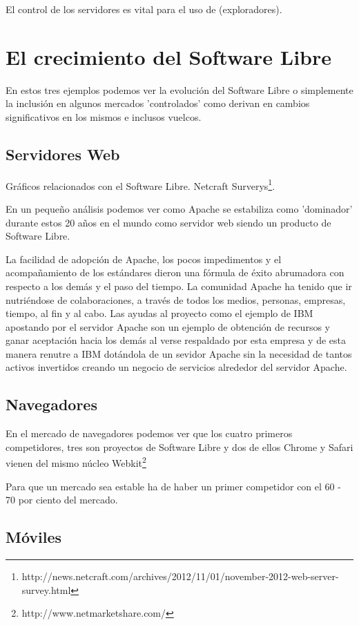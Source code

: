 \documentclass[11pt]{scrartcl}
\begin{document}
El control de los servidores es vital para el uso de (exploradores).

\section{El crecimiento del Software Libre}

En estos tres ejemplos podemos ver la evolución del Software Libre o simplemente la inclusión en algunos mercados 'controlados' como derivan en cambios significativos en los mismos e inclusos vuelcos.

\subsection{Servidores Web}

Gráficos relacionados con el Software Libre. Netcraft Surverys\footnote{http://news.netcraft.com/archives/2012/11/01/november-2012-web-server-survey.html}.

En un pequeño análisis podemos ver como Apache se estabiliza como 'dominador' durante estos 20 años en el mundo como servidor web siendo un producto de Software Libre.

La facilidad de adopción de Apache, los pocos impedimentos y el acompañamiento de los estándares dieron una fórmula de éxito abrumadora con respecto a los demás y el paso del tiempo.
La comunidad Apache ha tenido que ir nutriéndose de colaboraciones, a través de todos los medios, personas, empresas, tiempo, al fin y al cabo.
Las ayudas al proyecto como el ejemplo de IBM apostando por el servidor Apache son un ejemplo de obtención de recursos y ganar aceptación hacia los demás al verse respaldado por esta empresa y de esta manera renutre a IBM dotándola de un sevidor Apache sin la necesidad de tantos activos invertidos creando un negocio de servicios alrededor del servidor Apache.

\subsection{Navegadores}

En el mercado de navegadores podemos ver que los cuatro primeros competidores, tres son proyectos de Software Libre y dos de ellos Chrome y Safari vienen del mismo núcleo Webkit\footnote{http://www.netmarketshare.com/}

Para que un mercado sea estable ha de haber un primer competidor con el 60 - 70 por ciento del mercado.

\subsection{Móviles}
\end{document}
